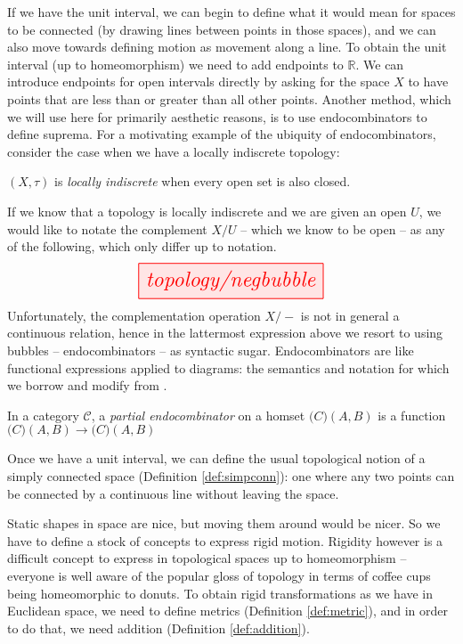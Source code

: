 If we have the unit interval, we can begin to define what it would mean for spaces to be connected (by drawing lines between points in those spaces), and we can also move towards defining motion as movement along a line. To obtain the unit interval (up to homeomorphism) we need to add endpoints to $\mathbb{R}$. We can introduce endpoints for open intervals directly by asking for the space $X$ to have points that are less than or greater than all other points. Another method, which we will use here for primarily aesthetic reasons, is to use endocombinators to define suprema. For a motivating example of the ubiquity of endocombinators, consider the case when we have a locally indiscrete topology:
\begin{defn}
$(X,\tau)$ is \emph{locally indiscrete} when every open set is also closed.
\end{defn}
If we know that a topology is locally indiscrete and we are given an open $U$, we would like to notate the complement $X/U$ -- which we know to be open -- as any of the following, which only differ up to notation.
\[\resizebox{0.5\textwidth}{!}{\tikzfig{topology/negbubble}}\]
Unfortunately, the complementation operation $X/-$ is not in general a continuous relation, hence in the lattermost expression above we resort to using bubbles -- endocombinators -- as syntactic sugar. Endocombinators are like functional expressions applied to diagrams: the semantics and notation for which we borrow and modify from \citep{haydon_compositional_2020}.
\begin{defn}
In a category $\mathcal{C}$, a \emph{partial endocombinator} on a homset $\mathcal(C)(A,B)$ is a function $\mathcal(C)(A,B) \rightarrow \mathcal(C)(A,B)$
\end{defn}


Once we have a unit interval, we can define the usual topological notion of a simply connected space (Definition \ref{def:simpconn}): one where any two points can be connected by a continuous line without leaving the space.


Static shapes in space are nice, but moving them around would be nicer. So we have to define a stock of concepts to express rigid motion. Rigidity however is a difficult concept to express in topological spaces up to homeomorphism -- everyone is well aware of the popular gloss of topology in terms of coffee cups being homeomorphic to donuts. To obtain rigid transformations as we have in Euclidean space, we need to define metrics (Definition \ref{def:metric}), and in order to do that, we need addition (Definition \ref{def:addition}).

